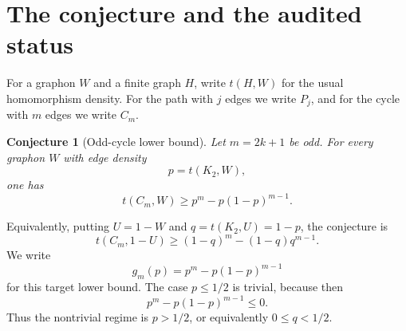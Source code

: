\documentclass[11pt]{article}
\newtheorem{conjecture}[theorem]{Conjecture}
\begin{document}
\section{The conjecture and the audited status}

For a graphon $W$ and a finite graph $H$, write $t(H,W)$ for the usual homomorphism density.  For the path with $j$ edges we write $P_j$, and for the cycle with $m$ edges we write $C_m$.

\begin{conjecture}[Odd-cycle lower bound]\label{conj:main}
Let $m=2k+1$ be odd.  For every graphon $W$ with edge density
\[
        p=t(K_2,W),
\]
one has
\[
        t(C_m,W)\ge p^m-p(1-p)^{m-1}.
\]
\end{conjecture}

Equivalently, putting $U=1-W$ and $q=t(K_2,U)=1-p$, the conjecture is
\[
        t(C_m,1-U)\ge (1-q)^m-(1-q)q^{m-1}.
\]
We write
\[
        g_m(p)=p^m-p(1-p)^{m-1}
\]
for this target lower bound.
The case $p\le 1/2$ is trivial, because then
\[
        p^m-p(1-p)^{m-1}\le 0.
\]
Thus the nontrivial regime is $p>1/2$, or equivalently $0\le q<1/2$.
\end{document}
